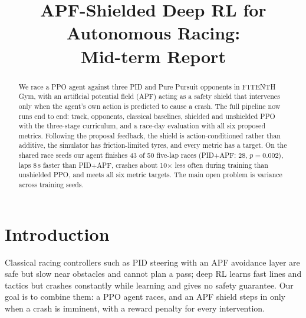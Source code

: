 \documentclass[conference]{IEEEtran}
\begin{document}
\title{APF-Shielded Deep RL for Autonomous Racing:\\Mid-term Report}

\author{
\and
{}
\and
{}
}

\maketitle

\begin{abstract}
We race a PPO agent against three PID and Pure Pursuit opponents in F1TENTH Gym, with an artificial potential
field (APF) acting as a safety shield that intervenes only when the agent's own action is predicted to cause a
crash. The full pipeline now runs end to end: track, opponents, classical baselines, shielded and unshielded PPO
with the three-stage curriculum, and a race-day evaluation with all six proposed metrics. Following the proposal
feedback, the shield is action-conditioned rather than additive, the simulator has friction-limited tyres, and
every metric has a target. On the shared race seeds our agent finishes 43 of 50 five-lap races (PID+APF: 28,
$p=0.002$), laps 8\,s faster than PID+APF, crashes about 10$\times$ less often during training than unshielded
PPO, and meets all six metric targets. The main open problem is variance across training seeds.
\end{abstract}

\section{Introduction}
Classical racing controllers such as PID steering with an APF avoidance layer are safe but slow near obstacles and
cannot plan a pass; deep RL learns fast lines and tactics but crashes constantly while learning and gives no safety
guarantee. Our goal is to combine them: a PPO agent races, and an APF shield steps in only when a crash is
imminent, with a reward penalty for every intervention.
\end{document}
